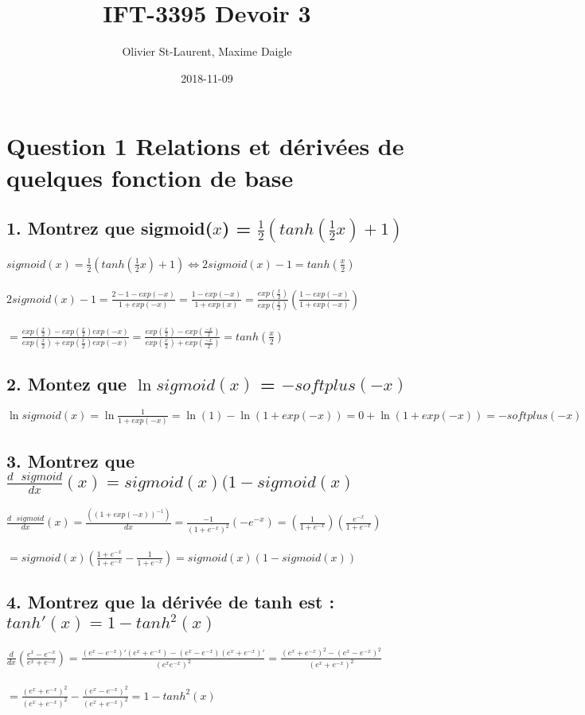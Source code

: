 \documentclass[12pt]{article}
\author{Olivier St-Laurent, Maxime Daigle}
\title{IFT-3395  Devoir 3}
\date{2018-11-09}
\begin{document}
\maketitle

\section{Question 1 Relations et dérivées de quelques fonction de base}

\subsection{1. Montrez que sigmoid($x$) = $\frac{1}{2}(tanh(\frac{1}{2}x) + 1)$}

	$ sigmoid(x) = \frac{1}{2}(tanh(\frac{1}{2}x) + 1)  \iff  2sigmoid(x) - 1 = tanh(\frac{x}{2}) $ \\
\\
	$ 2sigmoid(x) - 1 = \frac{2-1-exp(-x)}{1 + exp(-x)} = \frac{1 - exp(-x)}{1+exp(x)}  = \frac{exp(\frac{x}{2})}{exp(\frac{x}{2})} (\frac{1 - exp(-x)}{1+exp(-x)})$ \\
\\
	$ = \frac{exp(\frac{x}{2}) - exp(\frac{x}{2})exp(-x)}{exp(\frac{x}{2}) + exp(\frac{x}{2})exp(-x)} = \frac{exp(\frac{x}{2}) - exp(\frac{-x}{2})} {exp(\frac{x}{2}) + exp(\frac{-x}{2})} = tanh(\frac{x}{2})$

\subsection{2. Montez que $\ln sigmoid(x)$ = $-softplus(-x)$}
	$ \ln sigmoid(x) = \ln \frac{1}{1 + exp(-x)} = \ln(1) - \ln(1+exp(-x)) = 0 + \ln (1+exp(-x)) = -softplus(-x)$
	
\subsection{3. Montrez que $\frac{d\text{ }sigmoid}{dx}(x) = sigmoid(x)(1-sigmoid(x)$}
	$ \frac{d\text{ }sigmoid}{dx}(x) = \frac{((1+exp(-x))^{-1})}{dx} =  \frac{-1}{(1 + e^{-x})^{2}}(-e^{-x})  = (\frac{1}{1 + e^{-x}})(\frac{e^{-x}}{1+e^{-x}})$ \\
\\
$ = sigmoid(x)(\frac{1 + e^{-x}}{1 + e^{-x}} - \frac{1}{1 + e^{-x}}) =  sigmoid(x)(1 - sigmoid(x))$

\subsection{4. Montrez que la dérivée de tanh est : $tanh'(x) = 1 - tanh^{2}(x)$}
	$ \frac{d}{dx}(\frac{e^{x} - e^{-x}}{e^{x} + e^{-x}}) =  \frac{(e^{x} - e^{-x})'(e^{x} + e^{-x})-(e^{x} - e^{-x})(e^{x} + e^{-x})'}{(e^{x}e^{-x})^{2}} = \frac{(e^{x}+e^{-x})^{2} - (e^{x}-e^{-x})^{2}}{(e^{x}+e^{-x})^{2}}$ \\
\\
$ = \frac{(e^{x}+e^{-x})^{2}}{(e^{x}+e^{-x})^{2}} - \frac{(e^{x}-e^{-x})^{2}}{(e^{x} + e^{-x})^{2}} = 1 - tanh^{2}(x)$
\end{document}
